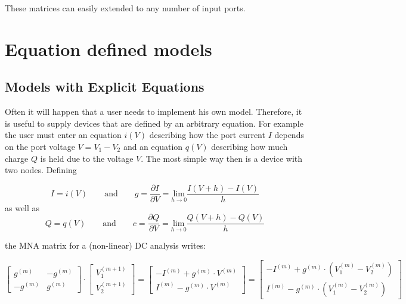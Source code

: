 These matrices can easily extended to any number of input ports.


\section{Equation defined models}
\label{sec:eqn_def_models}

\subsection{Models with Explicit Equations}

Often it will happen that a user needs to implement his own model.
Therefore, it is useful to supply devices that are defined by an
arbitrary equation. For example the user must enter an equation $i(V)$
describing how the port current $I$ depends on the port voltage $V=V_1-V_2$
and an equation $q(V)$ describing how much charge $Q$ is held due to
the voltage $V$. The most simple way then is a device with two nodes.
Defining

\begin{equation}
I = i(V) \qquad\text{and}\qquad
    g = \dfrac{\partial I}{\partial V}
      = \underset{h\rightarrow 0}{\text{lim}}\dfrac{I(V+h) - I(V)}{h}
\end{equation}
as well as
\begin{equation}
Q = q(V) \qquad\text{and}\qquad
    c = \dfrac{\partial Q}{\partial V}
      = \underset{h\rightarrow 0}{\text{lim}}\dfrac{Q(V+h) - Q(V)}{h}
\end{equation}

the MNA matrix for a (non-linear) DC analysis writes:

\begin{equation}
\begin{bmatrix}
 g^{(m)} & -g^{(m)}\\
-g^{(m)} &  g^{(m)}
\end{bmatrix}
\cdot
\begin{bmatrix}
V_{1}^{(m+1)}\\
V_{2}^{(m+1)}
\end{bmatrix}
=
\begin{bmatrix}
-I^{(m)} + g^{(m)}\cdot V^{(m)}\\
 I^{(m)} - g^{(m)}\cdot V^{(m)}
\end{bmatrix}
=
\begin{bmatrix}
-I^{(m)} + g^{(m)}\cdot (V_1^{(m)} - V_2^{(m)})\\
 I^{(m)} - g^{(m)}\cdot (V_1^{(m)} - V_2^{(m)})
\end{bmatrix}
\end{equation}

